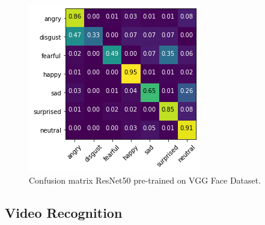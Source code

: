 \documentclass[sigconf]{acmart}
\begin{document}
{\begin{figure}[htbp]
	\includegraphics[width=0.7\linewidth]{images/image-vgg.png}
	\caption{Confusion matrix ResNet50 pre-trained on VGG Face Dataset.}
  \label{fig:image-vgg}
\end{figure}





\subsection{Video Recognition}

}
\end{document}

